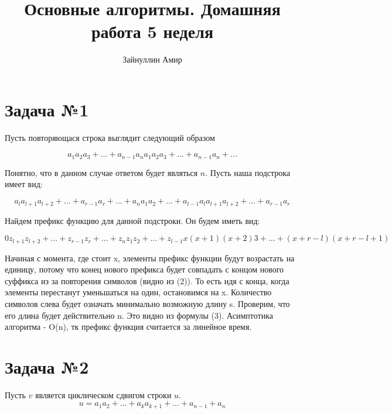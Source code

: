 \documentclass{article}
\begin{document}
\title{\textbf{Основные алгоритмы. Домашняя работа 5 неделя}}


\author{Зайнуллин Амир}
\maketitle

\section*{Задача №1}

Пусть повторяющася строка выглядит следующий образом

\begin{equation}
     a_1 a_2 a_3 +...+ a_{n - 1} a_n a_1 a_2 a_3 +...+ a_{n - 1} a_{n} + ... 
\end{equation}

Понятно, что в данном случае ответом будет являться $n$. Пусть наша подстрока имеет вид:

\begin{equation}
    a_{l} a_{l + 1} a_{l + 2} + ... + a_{r - 1} a_{r} + ... + a_n a_1 a_2 + ... + a_{l - 1} a_{l} a_{l + 1} a_{l + 2} + ... + a_{r - 1} a_{r}
\end{equation}

Найдем префикс функцию для данной подстроки. Он будем иметь вид:

\begin{equation}
    0 z_{l + 1} z_{l + 2} + ... + z_{r - 1} z_{r} + ... + z_n z_1 z_2 + ... + z_{l - 1} x (x + 1) (x + 2) 3 + ... + (x + r - l) (x + r - l + 1)
\end{equation}

Начиная с момента, где стоит x, элементы префикс функции будут возрастать на единицу, потому что конец нового префикса будет совпадать с концом нового суффикса из за повторения символов (видно из (2)).
То есть идя с конца, когда элементы перестанут уменьшаться на один, остановимся на x. Количество символов слева будет означать минимально возможную длину s. Проверим, что его длина будет действительно n. Это видно из формулы (3). Асимптотика алгоритма - O(n), тк префикс функция считается за линейное время.


\section*{Задача №2}
Пусть $v$ является циклическом сдвигом строки $u$.
\begin{equation}
    u = a_1 a_2 + ... + a_k a_{k + 1} + ... + a_{n - 1} + a_n
\end{equation}
\end{document}
